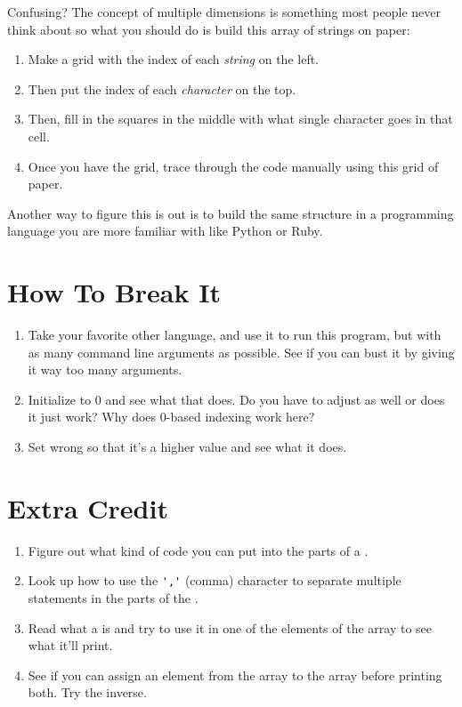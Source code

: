 Confusing? The concept of multiple dimensions is something most
people never think about so what you should do is build this
array of strings on paper:

\begin{enumerate}
\item Make a grid with the index of each \emph{string} on the left.
\item Then put the index of each \emph{character} on the top.
\item Then, fill in the squares in the middle with what single character
    goes in that cell.
\item Once you have the grid, trace through the code manually
    using this grid of paper.
\end{enumerate}

Another way to figure this is out is to build the same structure
in a programming language you are more familiar with like Python or
Ruby.

\section{How To Break It}

\begin{enumerate}
\item Take your favorite other language, and use it to run this program, but
    with as many command line arguments as possible.  See if you can bust it
    by giving it way too many arguments.
\item Initialize  to 0 and see what that does.  Do you have to adjust
     as well or does it just work?  Why does 0-based indexing work
    here?
\item Set  wrong so that it's a higher value and see what
    it does.
\end{enumerate}

\section{Extra Credit}

\begin{enumerate}
\item Figure out what kind of code you can put into the parts of a .
\item Look up how to use the \verb|','| (comma) character to separate multiple
    statements in the parts of the .
\item Read what a  is and try to use it in one of the elements of the
     array to see what it'll print.
\item See if you can assign an element from the  array to the
     array before printing both.  Try the inverse.
\end{enumerate}


